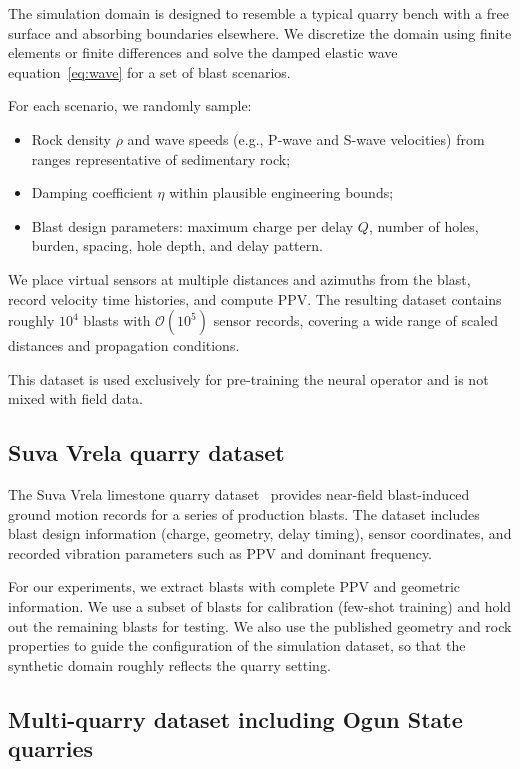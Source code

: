 \documentclass[a4paper,fleqn]{cas-sc}
\begin{document}
The simulation domain is designed to resemble a typical quarry bench
with a free surface and absorbing boundaries elsewhere.
We discretize the domain using finite elements or finite differences
and solve the damped elastic wave equation~\eqref{eq:wave}
for a set of blast scenarios.

For each scenario, we randomly sample:
\begin{itemize}
  \item Rock density $\rho$ and wave speeds (e.g., P-wave and S-wave velocities)
        from ranges representative of sedimentary rock;
  \item Damping coefficient $\eta$ within plausible engineering bounds;
  \item Blast design parameters: maximum charge per delay $Q$, number of holes,
        burden, spacing, hole depth, and delay pattern.
\end{itemize}
We place virtual sensors at multiple distances and azimuths from the blast,
record velocity time histories, and compute PPV.
The resulting dataset contains roughly $10^4$ blasts with $\mathcal{O}(10^5)$ sensor records,
covering a wide range of scaled distances and propagation conditions.

This dataset is used exclusively for pre-training the neural operator
and is not mixed with field data.

\subsection{Suva Vrela quarry dataset}

The Suva Vrela limestone quarry dataset~\citep{Kostic2013SuvaVrela}
provides near-field blast-induced ground motion records for a series of production blasts.
The dataset includes blast design information (charge, geometry, delay timing),
sensor coordinates, and recorded vibration parameters such as PPV and dominant frequency.

For our experiments, we extract blasts with complete PPV and geometric information.
We use a subset of blasts for calibration (few-shot training)
and hold out the remaining blasts for testing.
We also use the published geometry and rock properties
to guide the configuration of the simulation dataset,
so that the synthetic domain roughly reflects the quarry setting.

\subsection{Multi-quarry dataset including Ogun State quarries}
\end{document}
